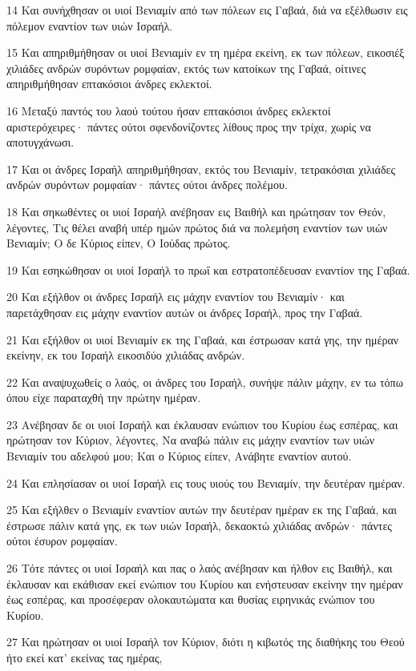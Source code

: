 \par 14 Και συνήχθησαν οι υιοί Βενιαμίν από των πόλεων εις Γαβαά, διά να εξέλθωσιν εις πόλεμον εναντίον των υιών Ισραήλ.
\par 15 Και απηριθμήθησαν οι υιοί Βενιαμίν εν τη ημέρα εκείνη, εκ των πόλεων, εικοσιέξ χιλιάδες ανδρών συρόντων ρομφαίαν, εκτός των κατοίκων της Γαβαά, οίτινες απηριθμήθησαν επτακόσιοι άνδρες εκλεκτοί.
\par 16 Μεταξύ παντός του λαού τούτου ήσαν επτακόσιοι άνδρες εκλεκτοί αριστερόχειρες· πάντες ούτοι σφενδονίζοντες λίθους προς την τρίχα, χωρίς να αποτυγχάνωσι.
\par 17 Και οι άνδρες Ισραήλ απηριθμήθησαν, εκτός του Βενιαμίν, τετρακόσιαι χιλιάδες ανδρών συρόντων ρομφαίαν· πάντες ούτοι άνδρες πολέμου.
\par 18 Και σηκωθέντες οι υιοί Ισραήλ ανέβησαν εις Βαιθήλ και ηρώτησαν τον Θεόν, λέγοντες, Τις θέλει αναβή υπέρ ημών πρώτος διά να πολεμήση εναντίον των υιών Βενιαμίν; Ο δε Κύριος είπεν, Ο Ιούδας πρώτος.
\par 19 Και εσηκώθησαν οι υιοί Ισραήλ το πρωΐ και εστρατοπέδευσαν εναντίον της Γαβαά.
\par 20 Και εξήλθον οι άνδρες Ισραήλ εις μάχην εναντίον του Βενιαμίν· και παρετάχθησαν εις μάχην εναντίον αυτών οι άνδρες Ισραήλ, προς την Γαβαά.
\par 21 Και εξήλθον οι υιοί Βενιαμίν εκ της Γαβαά, και έστρωσαν κατά γης, την ημέραν εκείνην, εκ του Ισραήλ εικοσιδύο χιλιάδας ανδρών.
\par 22 Και αναψυχωθείς ο λαός, οι άνδρες του Ισραήλ, συνήψε πάλιν μάχην, εν τω τόπω όπου είχε παραταχθή την πρώτην ημέραν.
\par 23 Ανέβησαν δε οι υιοί Ισραήλ και έκλαυσαν ενώπιον του Κυρίου έως εσπέρας, και ηρώτησαν τον Κύριον, λέγοντες, Να αναβώ πάλιν εις μάχην εναντίον των υιών Βενιαμίν του αδελφού μου; Και ο Κύριος είπεν, Ανάβητε εναντίον αυτού.
\par 24 Και επλησίασαν οι υιοί Ισραήλ εις τους υιούς του Βενιαμίν, την δευτέραν ημέραν.
\par 25 Και εξήλθεν ο Βενιαμίν εναντίον αυτών την δευτέραν ημέραν εκ της Γαβαά, και έστρωσε πάλιν κατά γης, εκ των υιών Ισραήλ, δεκαοκτώ χιλιάδας ανδρών· πάντες ούτοι έσυρον ρομφαίαν.
\par 26 Τότε πάντες οι υιοί Ισραήλ και πας ο λαός ανέβησαν και ήλθον εις Βαιθήλ, και έκλαυσαν και εκάθισαν εκεί ενώπιον του Κυρίου και ενήστευσαν εκείνην την ημέραν έως εσπέρας, και προσέφεραν ολοκαυτώματα και θυσίας ειρηνικάς ενώπιον του Κυρίου.
\par 27 Και ηρώτησαν οι υιοί Ισραήλ τον Κύριον, διότι η κιβωτός της διαθήκης του Θεού ήτο εκεί κατ' εκείνας τας ημέρας,
